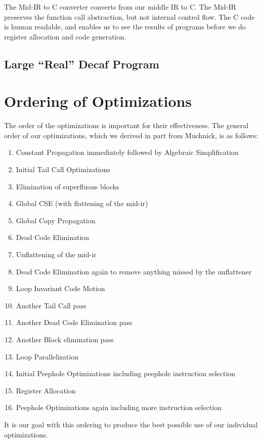 \documentclass[11pt]{article}
\begin{document}
The Mid-IR to C converter converts from our middle IR to C. The Mid-IR
preserves the function call abstraction, but not internal control
flow. The C code is human readable, and enables us to see the results
of programs before we do register allocation and code generation.

\subsection {Large ``Real'' Decaf Program}


\section {Ordering of Optimizations} 
\label{sec:order}

The order of the optimizations is important for their
effectiveness. The general order of our optimizations, which we derived
in part from Muchnick, is as follows: 

\begin{enumerate}

\item Constant Propagation immediately followed by Algebraic
  Simplification 

\item Initial Tail Call Optimizations 

\item Elimination of superfluous blocks 

\item Global CSE (with flattening of the mid-ir)

\item Global Copy Propagation

\item Dead Code Elimination

\item Unflattening of the mid-ir 

\item Dead Code Elimination again to remove anything missed by the
  unflattener 

\item Loop Invariant Code Motion

\item Another Tail Call pass 

\item Another Dead Code Elimination pass 

\item Another Block elimination pass 

\item Loop Parallelization

\item Initial Peephole Optimizations including peephole instruction selection

\item Register Allocation

\item Peephole Optimizations again including more instruction selection

\end{enumerate}

\noindent It is our goal with this ordering to produce the best possible use of
our individual optimizations. 
\end{document}
